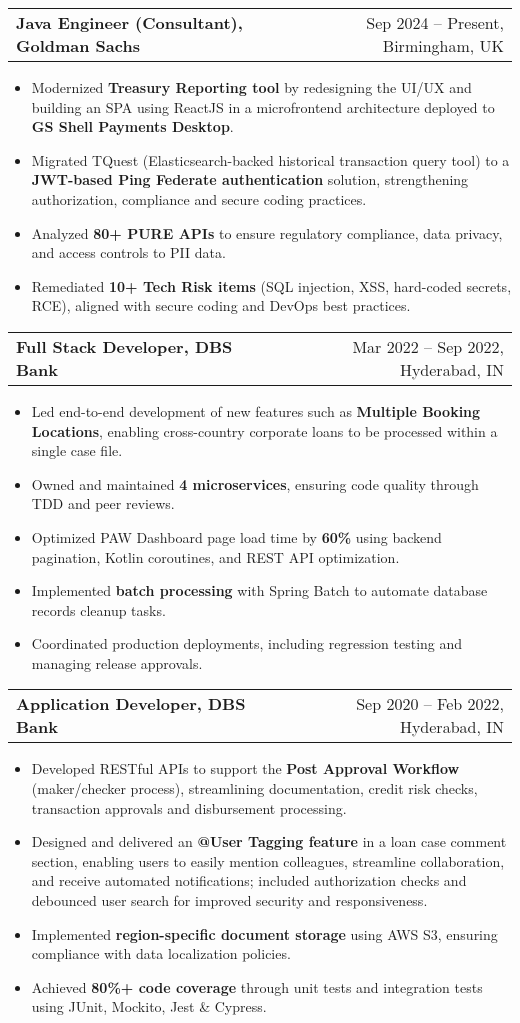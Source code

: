 \documentclass[a4paper,12pt]{article}
\makeatletter
\newenvironment{joblong}[2]
    {
    \begin{tabularx}{\linewidth}{@{}l X r@{}}
    \textbf{#1} & &  #2 \\
    \end{tabularx}
    \begin{minipage}[t]{\linewidth}
    \begin{itemize}[nosep,after=\strut, leftmargin=1em, itemsep=3pt,label=--]
    }
    {
    \end{itemize}
    \end{minipage}    
    }
\makeatother
\begin{document}
\begin{joblong}{Java Engineer (Consultant), Goldman Sachs}{Sep 2024 -- Present, Birmingham, UK}
\item Modernized \textbf{Treasury Reporting tool} by redesigning the UI/UX and building an SPA using ReactJS in a microfrontend architecture deployed to \textbf{GS Shell Payments Desktop}.
\item Migrated TQuest (Elasticsearch-backed historical transaction query tool) to a \textbf{JWT-based Ping Federate authentication} solution, strengthening authorization, compliance and secure coding practices.
\item Analyzed \textbf{80+ PURE APIs} to ensure regulatory compliance, data privacy, and access controls to PII data.
\item Remediated \textbf{10+ Tech Risk items} (SQL injection, XSS, hard-coded secrets, RCE), aligned with secure coding and DevOps best practices.
\end{joblong}
\begin{joblong}{Full Stack Developer, DBS Bank}{Mar 2022 -- Sep 2022, Hyderabad, IN}
\item Led end-to-end development of new features such as \textbf{Multiple Booking Locations}, enabling cross-country corporate loans to be processed within a single case file.
\item Owned and maintained \textbf{4 microservices}, ensuring code quality through TDD and peer reviews.
\item Optimized PAW Dashboard page load time by \textbf{60\%} using backend pagination, Kotlin coroutines, and REST API optimization.
\item Implemented \textbf{batch processing} with Spring Batch to automate database records cleanup tasks.
\item Coordinated production deployments, including regression testing and managing release approvals.
\end{joblong}
\begin{joblong}{Application Developer, DBS Bank}{Sep 2020 -- Feb 2022, Hyderabad, IN}
\item Developed RESTful APIs to support the \textbf{Post Approval Workflow} (maker/checker process), streamlining documentation, credit risk checks, transaction approvals and disbursement processing.
\item Designed and delivered an \textbf{@User Tagging feature} in a loan case comment section, enabling users to easily mention colleagues, streamline collaboration, and receive automated notifications; included authorization checks and debounced user search for improved security and responsiveness.
\item Implemented \textbf{region-specific document storage} using AWS S3, ensuring compliance with data localization policies.
\item Achieved \textbf{80\%+ code coverage} through unit tests and integration tests using JUnit, Mockito, Jest \& Cypress.
\end{joblong}
\end{document}
